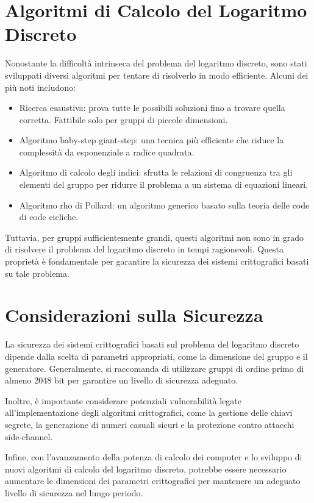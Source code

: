 \documentclass[a4paper,12pt]{report}
\begin{document}
\section{Algoritmi di Calcolo del Logaritmo Discreto}
Nonostante la difficoltà intrinseca del problema del logaritmo discreto, sono stati sviluppati diversi algoritmi per tentare di risolverlo in modo efficiente. Alcuni dei più noti includono:

\begin{itemize}
    \item Ricerca esaustiva: prova tutte le possibili soluzioni fino a trovare quella corretta. Fattibile solo per gruppi di piccole dimensioni.
    \item Algoritmo baby-step giant-step: una tecnica più efficiente che riduce la complessità da esponenziale a radice quadrata.
    \item Algoritmo di calcolo degli indici: sfrutta le relazioni di congruenza tra gli elementi del gruppo per ridurre il problema a un sistema di equazioni lineari.
    \item Algoritmo rho di Pollard: un algoritmo generico basato sulla teoria delle code di code cicliche.
\end{itemize}

Tuttavia, per gruppi sufficientemente grandi, questi algoritmi non sono in grado di risolvere il problema del logaritmo discreto in tempi ragionevoli. Questa proprietà è fondamentale per garantire la sicurezza dei sistemi crittografici basati su tale problema.

\section{Considerazioni sulla Sicurezza}
La sicurezza dei sistemi crittografici basati sul problema del logaritmo discreto dipende dalla scelta di parametri appropriati, come la dimensione del gruppo e il generatore. Generalmente, si raccomanda di utilizzare gruppi di ordine primo di almeno 2048 bit per garantire un livello di sicurezza adeguato.

Inoltre, è importante considerare potenziali vulnerabilità legate all'implementazione degli algoritmi crittografici, come la gestione delle chiavi segrete, la generazione di numeri casuali sicuri e la protezione contro attacchi side-channel.

Infine, con l'avanzamento della potenza di calcolo dei computer e lo sviluppo di nuovi algoritmi di calcolo del logaritmo discreto, potrebbe essere necessario aumentare le dimensioni dei parametri crittografici per mantenere un adeguato livello di sicurezza nel lungo periodo.
\end{document}
